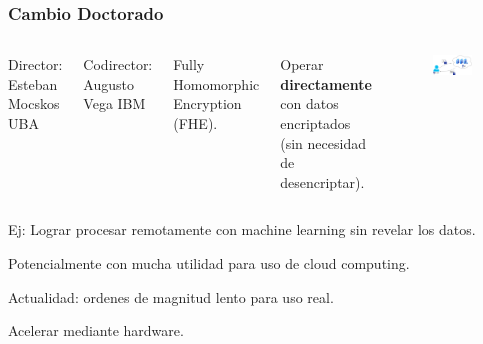 \documentclass[10pt]{beamer}
\begin{document}
\begin{frame}
\frametitle{Cambio Doctorado}
        \vspace{0.3cm}

\begin{columns}
        Director: Esteban Mocskos UBA
        \vspace{0.3cm}

        Codirector: Augusto Vega IBM

        \vspace{0.3cm}
        Fully Homomorphic Encryption (FHE).

\pause
        \vspace{0.3cm}
        Operar \textbf{directamente} con datos encriptados (sin necesidad de desencriptar).


\begin{figure}[h!]
    \centering
    \includegraphics[scale=0.19]{fhe.jpg}
\end{figure}
\end{columns}


\pause
Ej: Lograr procesar remotamente con machine learning sin revelar los datos.
 \vspace{-0.25cm}

Potencialmente con mucha utilidad para uso de cloud computing.
 \vspace{-0.15cm}

\pause
Actualidad: ordenes de magnitud lento para uso real.
 \vspace{-0.15cm}

\pause
\begin{mdframed}[backgroundcolor=frenchblue!20]\centering
  Acelerar mediante hardware.
\end{mdframed}

\end{frame}
\end{document}
